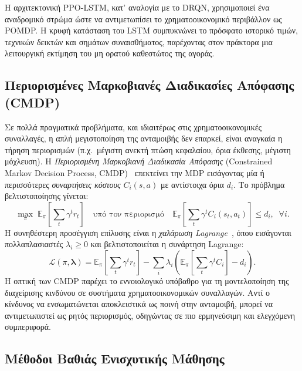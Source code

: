 Η αρχιτεκτονική PPO-LSTM, κατ' αναλογία με το DRQN, χρησιμοποιεί ένα
αναδρομικό στρώμα ώστε να αντιμετωπίσει το χρηματοοικονομικό περιβάλλον ως
POMDP. Η κρυφή κατάσταση του LSTM συμπυκνώνει το πρόσφατο ιστορικό τιμών,
τεχνικών δεικτών και σημάτων συναισθήματος, παρέχοντας στον πράκτορα μια
λειτουργική εκτίμηση του μη ορατού καθεστώτος της αγοράς.


\subsection{Περιορισμένες Μαρκοβιανές Διαδικασίες Απόφασης (CMDP)}
\label{subsec:cmdp}

Σε πολλά πραγματικά προβλήματα, και ιδιαιτέρως στις χρηματοοικονομικές
συναλλαγές, η απλή μεγιστοποίηση της ανταμοιβής δεν επαρκεί, είναι αναγκαία η
τήρηση περιορισμών (π.χ.\ μέγιστη ανεκτή πτώση κεφαλαίου, όρια έκθεσης,
μέγιστη μόχλευση). Η \emph{Περιορισμένη Μαρκοβιανή Διαδικασία Απόφασης}
(Constrained Markov Decision Process,
CMDP)~\cite{altman1999cmdp} επεκτείνει την MDP εισάγοντας μία ή περισσότερες
\emph{συναρτήσεις κόστους} $C_i(s, a)$ με αντίστοιχα όρια $d_i$. Το πρόβλημα
βελτιστοποίησης γίνεται:
\begin{equation}
    \max_{\pi}\; \mathbb{E}_{\pi}\!\left[\sum_{t} \gamma^{t} r_t\right]
    \quad \text{υπό τον περιορισμό} \quad
    \mathbb{E}_{\pi}\!\left[\sum_{t} \gamma^{t} C_i(s_t, a_t)\right]
    \le d_i, \;\; \forall i.
    \label{eq:cmdp}
\end{equation}
Η συνηθέστερη προσέγγιση επίλυσης είναι η \emph{χαλάρωση Lagrange}~\cite{tessler2018rcpo, altman1999cmdp},
όπου εισάγονται πολλαπλασιαστές $\lambda_i \ge 0$ και βελτιστοποιείται η
συνάρτηση Lagrange:
\begin{equation}
    \mathcal{L}(\pi, \boldsymbol{\lambda}) =
    \mathbb{E}_{\pi}\!\left[\sum_{t}\gamma^{t} r_t\right]
    - \sum_{i} \lambda_i \left(
        \mathbb{E}_{\pi}\!\left[\sum_{t}\gamma^{t} C_i\right] - d_i
    \right).
    \label{eq:cmdp-lagrangian}
\end{equation}
Η οπτική των CMDP παρέχει το εννοιολογικό υπόβαθρο για τη μοντελοποίηση
της διαχείρισης κινδύνου σε συστήματα χρηματοοικονομικών συναλλαγών. Αντί ο
κίνδυνος να ενσωματώνεται αποκλειστικά ως ποινή στην ανταμοιβή, μπορεί να
αντιμετωπιστεί ως ρητός περιορισμός, οδηγώντας σε πιο ερμηνεύσιμη και
ελεγχόμενη συμπεριφορά.


\subsection{Μέθοδοι Βαθιάς Ενισχυτικής Μάθησης}
\label{subsec:drl-methods}

